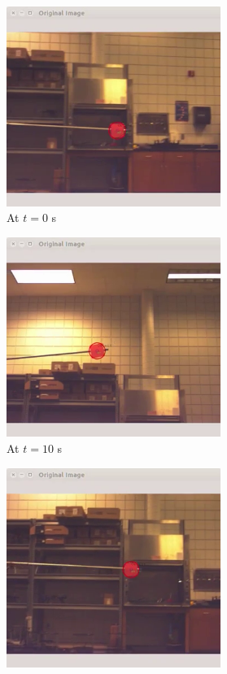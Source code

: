 \begin{figure}[htbp]
	\centering
	\begin{subfigure}{0.5\textwidth}
		\centering
		\includegraphics[height=6.5cm]{images/chapter2/gimbal_hardware_1.png}
		\caption{At $t=0$ s}
	\end{subfigure}%
	\begin{subfigure}{0.5\textwidth}
		\centering
		\includegraphics[height=6.5cm]{images/chapter2/gimbal_hardware_2.png}
		\caption{At $t=10$ s}
	\end{subfigure}
	\begin{subfigure}{0.5\textwidth}
		\centering
		\includegraphics[height=6.5cm]{images/chapter2/gimbal_hardware_3.png}

\end{subfigure}
\end{figure}
